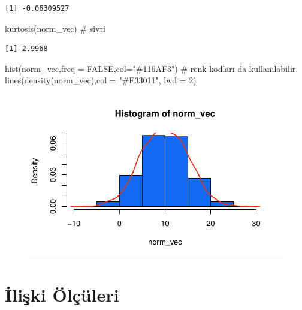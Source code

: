 \documentclass[
  letterpaper,
  DIV=11,
  numbers=noendperiod]{scrreprt}
\newenvironment{Shaded}{\begin{snugshade}}{\end{snugshade}}
\newcommand{\AttributeTok}[1]{\textcolor[rgb]{0.40,0.45,0.13}{#1}}
\newcommand{\CommentTok}[1]{\textcolor[rgb]{0.37,0.37,0.37}{#1}}
\newcommand{\ConstantTok}[1]{\textcolor[rgb]{0.56,0.35,0.01}{#1}}
\newcommand{\DecValTok}[1]{\textcolor[rgb]{0.68,0.00,0.00}{#1}}
\newcommand{\FunctionTok}[1]{\textcolor[rgb]{0.28,0.35,0.67}{#1}}
\newcommand{\NormalTok}[1]{\textcolor[rgb]{0.00,0.23,0.31}{#1}}
\newcommand{\StringTok}[1]{\textcolor[rgb]{0.13,0.47,0.30}{#1}}
\begin{document}
\begin{verbatim}
[1] -0.06309527
\end{verbatim}

\begin{Shaded}
\begin{Highlighting}[]
\FunctionTok{kurtosis}\NormalTok{(norm\_vec) }\CommentTok{\# sivri}
\end{Highlighting}
\end{Shaded}

\begin{verbatim}
[1] 2.9968
\end{verbatim}

\begin{Shaded}
\begin{Highlighting}[]
\FunctionTok{hist}\NormalTok{(norm\_vec,}\AttributeTok{freq =} \ConstantTok{FALSE}\NormalTok{,}\AttributeTok{col=}\StringTok{"\#116AF3"}\NormalTok{) }\CommentTok{\# renk kodları da kullanılabilir.}
\FunctionTok{lines}\NormalTok{(}\FunctionTok{density}\NormalTok{(norm\_vec),}\AttributeTok{col =} \StringTok{"\#F33011"}\NormalTok{, }\AttributeTok{lwd =} \DecValTok{2}\NormalTok{)}
\end{Highlighting}
\end{Shaded}

\begin{figure}[H]

{\centering \includegraphics{statistics_files/figure-pdf/unnamed-chunk-10-3.pdf}

}

\end{figure}

\hypertarget{iliux15fki-uxf6luxe7uxfcleri}{%
\section*{İlişki Ölçüleri}\label{iliux15fki-uxf6luxe7uxfcleri}}
\end{document}
